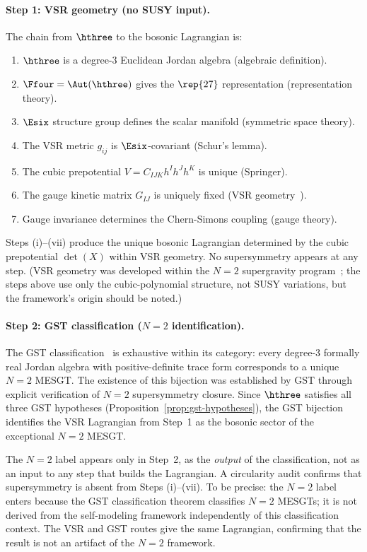 \paragraph{Step 1: VSR geometry (no SUSY input).}
The chain from $\hthree$ to the bosonic Lagrangian is:

\begin{enumerate}[label=(\roman*)]
\item $\hthree$ is a degree-3 Euclidean Jordan algebra (algebraic
  definition).
\item $\Ffour = \Aut(\hthree)$ gives the $\rep{27}$ representation
  (representation theory).
\item $\Esix$ structure group defines the scalar manifold (symmetric
  space theory).
\item The VSR metric $g_{ij}$ is $\Esix$-covariant (Schur's lemma).
\item The cubic prepotential $V = C_{IJK} h^I h^J h^K$ is unique
  (Springer).
\item The gauge kinetic matrix $G_{IJ}$ is uniquely fixed (VSR
  geometry~\cite{deWitVanProeyen1992}).
\item Gauge invariance determines the Chern-Simons coupling
  (gauge theory).
\end{enumerate}

Steps (i)--(vii) produce the unique bosonic Lagrangian determined by
the cubic prepotential $\det(X)$ within VSR geometry. No
supersymmetry appears at any step. (VSR geometry was developed within
the $N{=}2$ supergravity program~\cite{deWitVanProeyen1992}; the
steps above use only the cubic-polynomial structure, not SUSY
variations, but the framework's origin should be noted.)

\paragraph{Step 2: GST classification ($N{=}2$ identification).}
The GST classification~\cite{GST1983,GST1984} is exhaustive within its
category: every degree-3 formally real Jordan algebra with
positive-definite trace form corresponds to a unique $N{=}2$ MESGT. The
existence of this bijection was established by GST through explicit
verification of $N{=}2$ supersymmetry closure. Since $\hthree$ satisfies
all three GST hypotheses (Proposition~\ref{prop:gst-hypotheses}), the
GST bijection identifies the VSR Lagrangian from Step~1 as the bosonic
sector of the exceptional $N{=}2$ MESGT.

The $N{=}2$ label appears only in Step~2, as the \emph{output} of
the classification, not as an input to any step that builds the
Lagrangian. A circularity audit confirms that supersymmetry is absent
from Steps (i)--(vii). To be precise: the $N{=}2$ label enters because
the GST classification theorem classifies $N{=}2$ MESGTs; it is not
derived from the self-modeling framework independently of this
classification context. The VSR and GST routes give the same Lagrangian,
confirming that the result is not an artifact of the $N{=}2$ framework.

